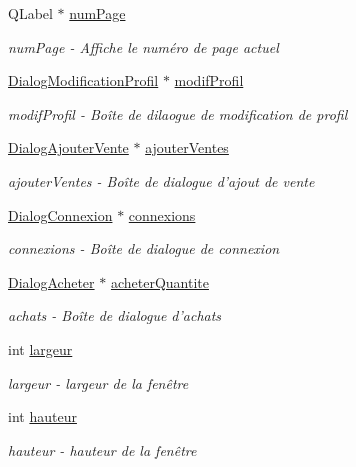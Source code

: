 \begin{DoxyCompactItemize}
Q\-Label $\ast$ \hyperlink{class_ma_fenetre_a941eff753d1e20d0ef212aa875570330}{num\-Page}
\begin{DoxyCompactList}\small\item\em num\-Page -\/ Affiche le numéro de page actuel \end{DoxyCompactList}\item 
\hyperlink{class_dialog_modification_profil}{Dialog\-Modification\-Profil} $\ast$ \hyperlink{class_ma_fenetre_accfaae414323cd476f255f51a98414f0}{modif\-Profil}
\begin{DoxyCompactList}\small\item\em modif\-Profil -\/ Boîte de dilaogue de modification de profil \end{DoxyCompactList}\item 
\hyperlink{class_dialog_ajouter_vente}{Dialog\-Ajouter\-Vente} $\ast$ \hyperlink{class_ma_fenetre_a2332279c45b76ac1c9daf739c0bb3958}{ajouter\-Ventes}
\begin{DoxyCompactList}\small\item\em ajouter\-Ventes -\/ Boîte de dialogue d'ajout de vente \end{DoxyCompactList}\item 
\hyperlink{class_dialog_connexion}{Dialog\-Connexion} $\ast$ \hyperlink{class_ma_fenetre_a3c115601ad85a01422813dcdf48eb44d}{connexions}
\begin{DoxyCompactList}\small\item\em connexions -\/ Boîte de dialogue de connexion \end{DoxyCompactList}\item 
\hyperlink{class_dialog_acheter}{Dialog\-Acheter} $\ast$ \hyperlink{class_ma_fenetre_a8682e6343da2d0c2bfe1fab3ff0e7baa}{acheter\-Quantite}
\begin{DoxyCompactList}\small\item\em achats -\/ Boîte de dialogue d'achats \end{DoxyCompactList}\item 
int \hyperlink{class_ma_fenetre_abe37db89fd8895cc34ccc0f5cda67aaf}{largeur}
\begin{DoxyCompactList}\small\item\em largeur -\/ largeur de la fenêtre \end{DoxyCompactList}\item 
int \hyperlink{class_ma_fenetre_ae1a802d46705239d08d3bf06cd99b802}{hauteur}
\begin{DoxyCompactList}\small\item\em hauteur -\/ hauteur de la fenêtre \end{DoxyCompactList}\item 

\end{DoxyCompactItemize}

